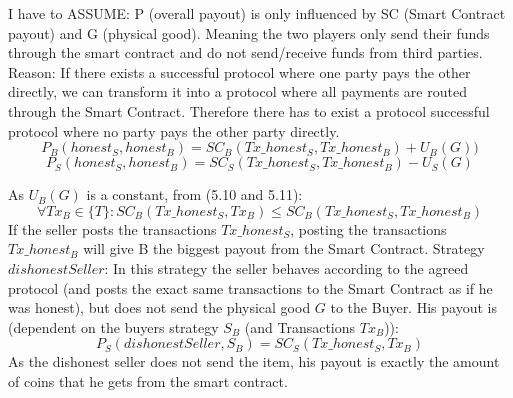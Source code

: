 \documentclass{cacthesis}
\begin{document}
I have to ASSUME: P (overall payout) is only influenced by SC (Smart Contract payout) and G (physical good). Meaning the two players only send their funds through the smart contract and do not send/receive funds from third parties.\newline
Reason: If there exists a successful protocol where one party pays the other directly, we can transform it into a protocol where all payments are routed through the Smart Contract. Therefore there has to exist a protocol successful protocol where no party pays the other party directly.
\begin{equation}
    P_B(honest_S,honest_B) = SC_B(Tx\_honest_S, Tx\_honest_B) + U_B(G))
\end{equation} 
\begin{equation}
    P_S(honest_S,honest_B) = SC_S(Tx\_honest_S, Tx\_honest_B) - U_S(G) 
\end{equation}

As $U_B(G)$ is a constant, from (5.10 and 5.11):
\begin{equation}
    \forall Tx_B \in \{T\}: SC_B(Tx\_honest_S, Tx_B) \leq SC_B(Tx\_honest_S, Tx\_honest_B)
\end{equation}
If the seller posts the transactions $Tx\_honest_S$, posting the transactions $Tx\_honest_B$ will give B the biggest payout from the Smart Contract.
Strategy $dishonestSeller$: In this strategy the seller behaves according to the agreed protocol (and posts the exact same transactions to the Smart Contract as if he was honest), but does not send the physical good $G$ to the Buyer.\newline
His payout is (dependent on the buyers strategy $S_B$ (and Transactions $Tx_B$)):
\begin{equation}
    P_S(dishonestSeller,S_B) = SC_S(Tx\_honest_S,Tx_B)
\end{equation}
As the dishonest seller does not send the item, his payout is exactly the amount of coins that he gets from the smart contract.\newline
\end{document}
